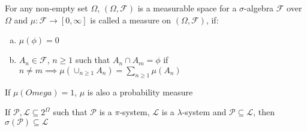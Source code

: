 \begin{definition}
	For any non-empty set $\Omega$, $(\Omega,\mathcal F)$ is a measurable space for a $\sigma$-algebra $\mathcal F$ over $\Omega$ and $\mu : \mathcal F \to [0,\infty]$ is called a measure on $(\Omega, \mathcal F)$, if:
	\begin{enumerate}[a)]
		\item $\mu(\phi)=0$
		\item $A_n \in \mathcal F$, $n \geq 1$ such that $A_n \cap A_m = \phi$ if $n \neq m \implies \mu(\cup_{n \geq 1} A_n) = \sum_{n \geq 1} \mu(A_n)$
	\end{enumerate}
	If $\mu(Omega)=1$, $\mu$ is also a probability measure
\end{definition}

\begin{theorem}
	If $\mathcal P,\mathcal L \subseteq 2^\Omega$ such that $\mathcal P$ is a $\pi$-system, $\mathcal L$ is a $\lambda$-system and $\mathcal P \subseteq \mathcal L$, then $\sigma(\mathcal P) \subseteq \mathcal L$
\end{theorem}

